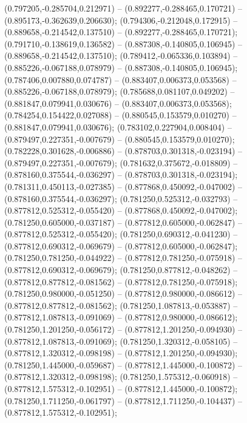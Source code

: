  (0.797205,-0.285704,0.212971) -- (0.892277,-0.288465,0.170721) -- (0.895173,-0.362639,0.206630);
 (0.794306,-0.212048,0.172915) -- (0.889658,-0.214542,0.137510) -- (0.892277,-0.288465,0.170721);
 (0.791710,-0.138619,0.136582) -- (0.887308,-0.140805,0.106945) -- (0.889658,-0.214542,0.137510);
 (0.789412,-0.065336,0.103894) -- (0.885226,-0.067188,0.078979) -- (0.887308,-0.140805,0.106945);
 (0.787406,0.007880,0.074787) -- (0.883407,0.006373,0.053568) -- (0.885226,-0.067188,0.078979);
 (0.785688,0.081107,0.049202) -- (0.881847,0.079941,0.030676) -- (0.883407,0.006373,0.053568);
 (0.784254,0.154422,0.027088) -- (0.880545,0.153579,0.010270) -- (0.881847,0.079941,0.030676);
 (0.783102,0.227904,0.008404) -- (0.879497,0.227351,-0.007679) -- (0.880545,0.153579,0.010270);
 (0.782228,0.301628,-0.006886) -- (0.878703,0.301318,-0.023194) -- (0.879497,0.227351,-0.007679);
 (0.781632,0.375672,-0.018809) -- (0.878160,0.375544,-0.036297) -- (0.878703,0.301318,-0.023194);
 (0.781311,0.450113,-0.027385) -- (0.877868,0.450092,-0.047002) -- (0.878160,0.375544,-0.036297);
 (0.781250,0.525312,-0.032793) -- (0.877812,0.525312,-0.055420) -- (0.877868,0.450092,-0.047002);
 (0.781250,0.605000,-0.037187) -- (0.877812,0.605000,-0.062847) -- (0.877812,0.525312,-0.055420);
 (0.781250,0.690312,-0.041230) -- (0.877812,0.690312,-0.069679) -- (0.877812,0.605000,-0.062847);
 (0.781250,0.781250,-0.044922) -- (0.877812,0.781250,-0.075918) -- (0.877812,0.690312,-0.069679);
 (0.781250,0.877812,-0.048262) -- (0.877812,0.877812,-0.081562) -- (0.877812,0.781250,-0.075918);
 (0.781250,0.980000,-0.051250) -- (0.877812,0.980000,-0.086612) -- (0.877812,0.877812,-0.081562);
 (0.781250,1.087813,-0.053887) -- (0.877812,1.087813,-0.091069) -- (0.877812,0.980000,-0.086612);
 (0.781250,1.201250,-0.056172) -- (0.877812,1.201250,-0.094930) -- (0.877812,1.087813,-0.091069);
 (0.781250,1.320312,-0.058105) -- (0.877812,1.320312,-0.098198) -- (0.877812,1.201250,-0.094930);
 (0.781250,1.445000,-0.059687) -- (0.877812,1.445000,-0.100872) -- (0.877812,1.320312,-0.098198);
 (0.781250,1.575312,-0.060918) -- (0.877812,1.575312,-0.102951) -- (0.877812,1.445000,-0.100872);
 (0.781250,1.711250,-0.061797) -- (0.877812,1.711250,-0.104437) -- (0.877812,1.575312,-0.102951);
